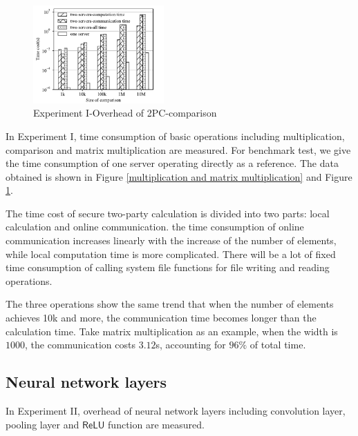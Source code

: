 \documentclass[letterpaper]{article} %
\begin{document}
    \begin{figure}[htbp]

        \centering
        \includegraphics[width=5cm]{operation_compare.pdf}
        \caption{Experiment I-Overhead of 2PC-comparison}
        \label{operation_compare}
    \end{figure}
    In Experiment I, time consumption of basic operations including multiplication, comparison and matrix multiplication are measured.
    For benchmark test, we give the time consumption of one server operating directly as a reference.
    The data obtained is shown in Figure \ref{multiplication and matrix multiplication} and Figure \ref{operation_compare}.

    The time cost of secure two-party calculation is divided into two parts:
    local calculation and online communication.
    the time consumption of online communication increases linearly with the increase of the number of elements,
    while local computation time is more complicated.
    There will be a lot of fixed time consumption of calling system file functions
    for file writing and reading operations.

    The three operations show the same trend that
    when the number of elements achieves 10k and more,
    the communication time becomes longer than the calculation time.
    Take matrix multiplication as an example,
    when the width is $1000$, the communication costs $3.12$s, accounting for $96\%$ of total time.

    \subsection{Neural network layers}
    In Experiment II, overhead of neural network layers including
    convolution layer, pooling layer and $\mathsf{ReLU}$ function are measured.
\end{document}

